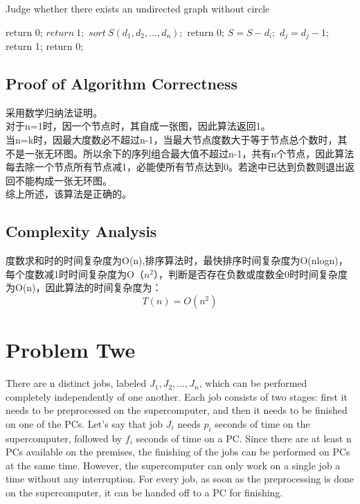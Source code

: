 \documentclass{article}
\begin{document}
\begin{CJK*}{UTF8}{gbsn}
\begin{algorithm}[htbp]  
  \caption{Judge whether there exists an undirected graph without circle}  
  \begin{algorithmic}[1] 
	\State return 0;
	\EndIf
	\State $return\ 1;$ 
	\EndIf
	\State $sort\ S(d_1,d_2,...,d_n);$
	\State return 0;
	\EndIf
	\State $S = S - d_i;$
	\State $d_j = d_j -1;$
	\EndFor
	\State return 1;
	\EndIf
	\State return 0;
	\EndIf
	\EndFor
    \EndFunction 
  \end{algorithmic}  
\end{algorithm} 

\subsection{Proof of Algorithm Correctness}
采用数学归纳法证明。\\

对于n=1时，因一个节点时，其自成一张图，因此算法返回1。\\

当n=k时，因最大度数必不超过n-1，当最大节点度数大于等于节点总个数时，其不是一张无环图。所以余下的序列组合最大值不超过n-1，共有n个节点，因此算法每去除一个节点所有节点减1，必能使所有节点达到0。若途中已达到负数则退出返回不能构成一张无环图。\\

综上所述，该算法是正确的。

\subsection{Complexity Analysis}
度数求和时的时间复杂度为O(n),排序算法时，最快排序时间复杂度为O(nlogn)，每个度数减1时时间复杂度为O（$n^2$），判断是否存在负数或度数全0时时间复杂度为O(n)，因此算法的时间复杂度为：
\begin{equation}
T(n) = O(n^2)
\end{equation}

\newpage
\section{Problem Twe}

There are n distinct jobs, labeled $J_1, J_2,..., J_n$, which can be performed completely independently of one another. Each job consists of two stages: first it needs to be preprocessed on the supercomputer, and then it needs to be finished on one of the PCs. Let's say that job $J_i$ needs $p_i$ seconds of time on the supercomputer, followed by $f_i$ seconds of time on a PC. Since there are at least n PCs available on the premises, the finishing of the jobs can be performed on PCs at the same time. However, the supercomputer can only work on a single job a time without any interruption. For every job, as soon as the preprocessing is done on the supercomputer, it can be handed off to a PC for finishing.


\end{CJK*}
\end{document}
